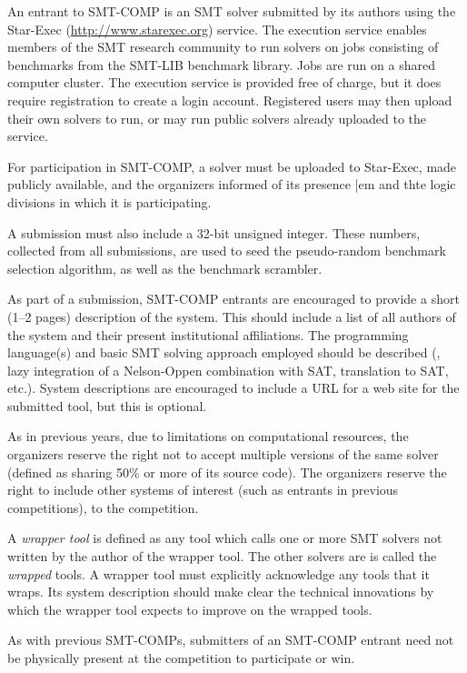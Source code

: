 \documentclass[12pt]{article}
\begin{document}
An entrant to SMT-COMP is an SMT solver
submitted by its authors using the Star-Exec (\url{http://www.starexec.org}) service.  
The execution service enables members of the
SMT research community to run solvers on jobs consisting of benchmarks
from the SMT-LIB benchmark library.  Jobs are run on a shared computer
cluster.  The execution service is provided free of
charge, but it does require registration to create a login account.  Registered users
may then upload their own solvers to run, or may run public solvers
already uploaded to the service.  


For participation in SMT-COMP, a solver must be
uploaded to Star-Exec, made publicly available, and the organizers informed of its presence {|em and thte logic divisions in which it is participating}.

A submission must also include a 32-bit unsigned
integer.  These numbers, collected from all submissions, are used
to seed the pseudo-random benchmark selection algorithm, as well
as the benchmark scrambler.

As part of a submission,
SMT-COMP entrants are encouraged to provide a short (1--2 pages) description of
the system.  This should include a list of all authors of the system
and their present institutional affiliations.  The programming
language(s) and basic SMT solving approach employed should be
described (\eg, lazy integration of a Nelson-Oppen combination with
SAT, translation to SAT, etc.).  System descriptions are encouraged to
include a URL for a web site for the submitted tool, but this is
optional.  

As in previous years, due to limitations on
computational resources, the organizers reserve the right not to
accept multiple versions of the same solver (defined as sharing 50\%
or more of its source code).  The organizers reserve the right to
include other systems of interest (such as entrants in previous competitions), to the
competition.

A \emph{wrapper tool} is defined as any tool
which calls one or more SMT solvers not written by the author of the wrapper
tool.  The other solvers are is called the \emph{wrapped} tools.  
A wrapper tool must explicitly acknowledge any tools that it wraps.
Its system description should make clear the technical innovations  by which the
wrapper tool expects to improve on the wrapped tools.

As with previous SMT-COMPs, submitters of an SMT-COMP entrant need not 
be physically present at the competition to
participate or win.
\end{document}

